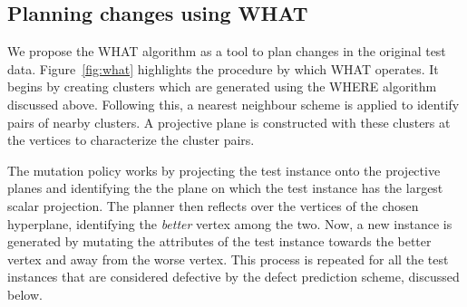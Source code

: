 \documentclass[conference]{IEEEtran}
\begin{document}
\subsection{Planning changes using WHAT}
We propose the WHAT algorithm as a tool to plan changes in the original test data. Figure~\ref{fig:what} highlights the procedure by which WHAT operates. It begins by creating clusters which are generated using the WHERE algorithm discussed above. Following this, a nearest neighbour scheme is applied to identify pairs of nearby clusters. A projective plane is constructed with these clusters at the vertices to characterize the cluster pairs.

The mutation policy works by projecting the test instance onto the projective planes and identifying the the plane on which the test instance has the largest scalar projection. The planner then reflects over the vertices of the chosen hyperplane, identifying the \textit{better} vertex among the two. Now, a new instance is generated by mutating the attributes of the test instance towards the better vertex and away from the worse vertex. This process is repeated for all the test instances that are considered defective by the defect prediction scheme, discussed below.
\end{document}
